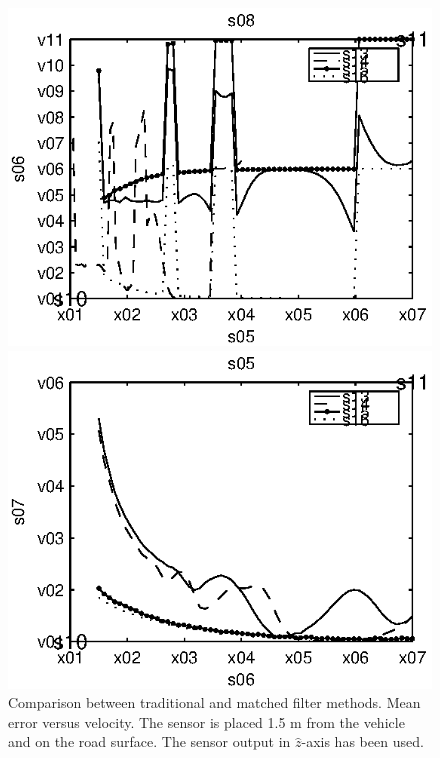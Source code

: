 \begin{subfigures}
\begin{figure}[!tbh]
  \centering
  \begin{minipage}{0.45\linewidth}
  \centering
  
   \includegraphics[width=\linewidth]{images/mean_error-velocity}
  \caption[Time difference, method comparison. Mean error versus velocity]{Comparison between traditional and matched filter methods. Mean error versus velocity. The sensor is placed 1.5 m from the vehicle and on the road surface. The sensor output in $\hat{z}$-axis has been used.}
  \label{fig:comp_mean-vel}
  \end{minipage}\hfill
  \begin{minipage}{0.45\linewidth}
   \centering
   
   \includegraphics[width=\linewidth]{images/std_error-velocity}

\end{minipage}
\end{figure}
\end{subfigures}
